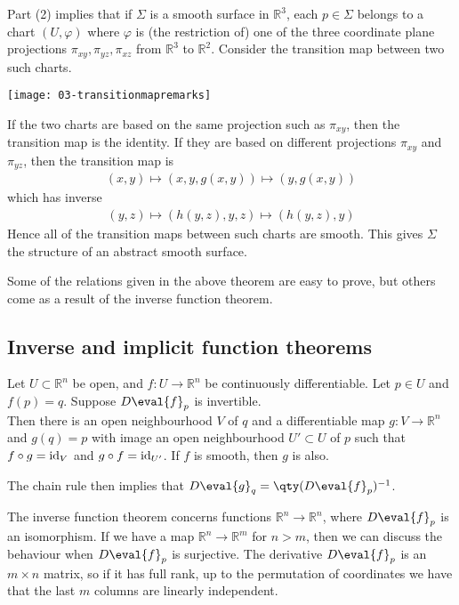 \begin{remark}
	Part (2) implies that if $\Sigma$ is a smooth surface in $\mathbb R^3$, each $p \in \Sigma$ belongs to a chart $(U, \varphi)$ where $\varphi$ is (the restriction of) one of the three coordinate plane projections $\pi_{xy}, \pi_{yz}, \pi_{xz}$ from $\mathbb R^3$ to $\mathbb R^2$.
	Consider the transition map between two such charts.
	{\par
	\centering 
    \texttt{[image: 03-transitionmapremarks]} 
	\par}
	If the two charts are based on the same projection such as $\pi_{xy}$, then the transition map is the identity.
	If they are based on different projections $\pi_{xy}$ and $\pi_{yz}$, then the transition map is
	\begin{align*}
		(x,y) \mapsto (x,y,g(x,y)) \mapsto (y,g(x,y))
	\end{align*}
	which has inverse
	\begin{align*}
		(y,z) \mapsto (h(y,z),y,z) \mapsto (h(y,z),y)
	\end{align*}
	Hence all of the transition maps between such charts are smooth.
	This gives $\Sigma$ the structure of an abstract smooth surface.
\end{remark}
Some of the relations given in the above theorem are easy to prove, but others come as a result of the inverse function theorem.

\subsection{Inverse and implicit function theorems}
\begin{theorem}
	Let $U \subset \mathbb R^n$ be open, and $f \colon U \to \mathbb R^n$ be continuously differentiable.
	Let $p \in U$ and $f(p) = q$.
	Suppose $D\eval{f}_p$ is invertible. \\
	Then there is an open neighbourhood $V$ of $q$ and a differentiable map $g \colon V \to \mathbb R^n$ and $g(q) = p$ with image an open neighbourhood $U' \subset U$ of $p$ such that $f \circ g = \operatorname{id}_V$ and $g \circ f = \operatorname{id}_{U'}$.
	If $f$ is smooth, then $g$ is also.
\end{theorem}

\begin{remark}
	The chain rule then implies that $D\eval{g}_q = \qty(D\eval{f}_p)^{-1}$.

	The inverse function theorem concerns functions $\mathbb R^n \to \mathbb R^n$, where $D\eval{f}_p$ is an isomorphism.
	If we have a map $\mathbb R^n \to \mathbb R^m$ for $n > m$, then we can discuss the behaviour when $D\eval{f}_p$ is surjective.
	The derivative $D\eval{f}_p$ is an $m \times n$ matrix, so if it has full rank, up to the permutation of coordinates we have that the last $m$ columns are linearly independent.
\end{remark}

